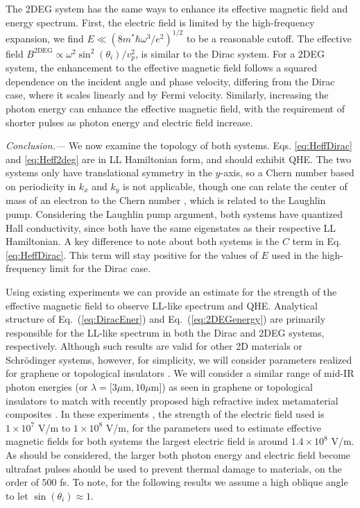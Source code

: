 \documentclass[aps,prb,twocolumn,showpacs,superscriptaddress]{revtex4-2}
\begin{document}
The 2DEG system has the same ways to enhance its effective magnetic field and energy spectrum.
First, the electric field is limited by the high-frequency expansion, we find $E \ll (8m^*\hbar\omega^3/e^2)^{1/2}$ to be a reasonable cutoff.
The effective field $B^{\text{2DEG}} \propto \omega^2 \sin^2{(\theta_i)} / v_p^2$, is similar to the Dirac system.
For a 2DEG system, the enhancement to the effective magnetic field follows a squared dependence on the incident angle and phase velocity, differing from the Dirac case, where it scales linearly and by Fermi velocity.
Similarly, increasing the photon energy can enhance the effective magnetic field, with the requirement of shorter pulses as photon energy and electric field increase.

\emph{Conclusion.---} We now examine the topology of both systems.
Eqs. \eqref{eq:HeffDirac} and \eqref{eq:Heff2deg} are in LL Hamiltonian form, and should exhibit QHE.
The two systems only have translational symmetry in the $y$-axis, so a Chern number based on periodicity in $k_x$ and $k_y$ is not applicable, though one can relate the center of mass of an electron to the Chern number \cite{supp}, which is related to the Laughlin pump.
Considering the Laughlin pump argument, both systems have quantized Hall conductivity, since both have the same eigenstates as their respective LL Hamiltonian.
A key difference to note about both systems is the $C$ term in Eq. \eqref{eq:HeffDirac}.
This term will stay positive for the values of $E$ used in the high-frequency limit for the Dirac case.

Using existing experiments \cite{YHW, JWM} we can provide an estimate for the strength of the effective magnetic field to observe LL-like spectrum and QHE.
Analytical structure of Eq.~(\ref{eq:DiracEner}) and Eq.~(\ref{eq:2DEGenergy}) are primarily responsible for the LL-like spectrum in both the Dirac and 2DEG systems, respectively.
Although such results are valid for other 2D materials or Schr\"{o}dinger systems, however, for simplicity, we will consider parameters realized for graphene or topological insulators \cite{YHW, JWM}.
We will consider a similar range of mid-IR photon energies (or $\lambda = [3\mu $m$ , 10\mu $m$]$) as seen in graphene or topological insulators \cite{YHW, JWM} to match with recently proposed high refractive index metamaterial composites \cite{shimFundamentalLimitsRefractive2021}.
In these experiments \cite{YHW, JWM}, the strength of the electric field used is $1 \times 10^7$ V/m to $1 \times 10^8$ V/m, for the parameters used to estimate effective magnetic fields for both systems the largest electric field is around $1.4 \times 10^8$ V/m.
As should be considered, the larger both photon energy and electric field become ultrafast pulses should be used to prevent thermal damage to materials, on the order of $500$ fs.
To note, for the following results we assume a high oblique angle to let $\sin{(\theta_i)} \approx 1$.
\end{document}
